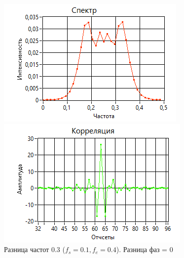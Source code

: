 \begin{figure}[H]
    \centering
    \begin{minipage}{0.49\linewidth}
        \includegraphics[width =0.9\linewidth]{imgs/spec2.png}
    \end{minipage}
    \begin{minipage}{0.49\linewidth}
        \includegraphics[width =0.9\linewidth]{imgs/corr2.png}
    \end{minipage}
	\caption{Разница частот 0.3 ($f_{s}=0.1, f_{e}=0.4$). Разница фаз = 0}
	\label{fig:spec2}
\end{figure}


